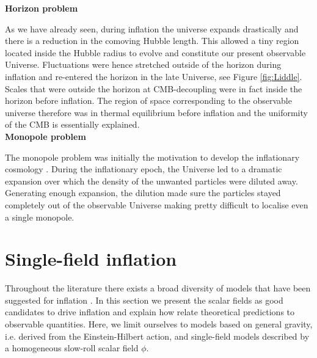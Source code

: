 \documentclass{rmaa}
\begin{document}
\vskip 16pt
\noindent
\textbf{Horizon problem}
\vskip 6pt


As we have already seen, during inflation the universe expands drastically and there is a 
reduction in the comoving Hubble length. This allowed a tiny region located inside the 
Hubble radius to evolve and constitute our present observable Universe. 
Fluctuations were hence stretched outside of the horizon during inflation and re-entered the horizon 
in the late Universe, see Figure \ref{fig:Liddle}. Scales that were outside the horizon at CMB-decoupling 
were in fact inside the horizon before inflation. The region of space corresponding to the 
observable universe therefore was in thermal equilibrium before inflation and the uniformity 
of the CMB is essentially explained.
\\


\vskip 16pt
\noindent
\textbf{Monopole problem}
\vskip 6pt

The monopole problem was initially the motivation to develop the inflationary
cosmology \citep{Guth2}.
%
During the inflationary epoch, the Universe led to a dramatic expansion
over which the density of the unwanted particles were diluted away. Generating enough
expansion, the dilution made sure the particles stayed completely out of the observable Universe
making pretty difficult to localise even a single monopole.     





\section{Single-field inflation}
\vskip 6pt


Throughout the literature there exists a broad diversity of models that have been suggested for inflation 
\citep{LiddleLyth, Olive, Lyth}. In this section we present the scalar fields as good candidates 
to drive inflation and explain how relate theoretical predictions to observable quantities. 
Here, we limit ourselves to models based on general gravity, i.e. derived from the
Einstein-Hilbert action, and single-field models described by a homogeneous slow-roll scalar field $\phi$.
\\
\end{document}
